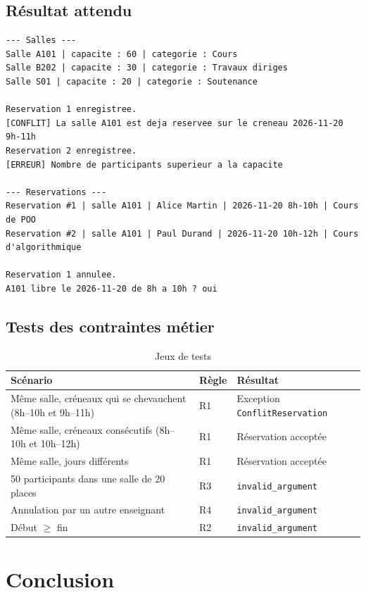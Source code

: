 \documentclass[12pt,a4paper]{report}
\begin{document}
\section{Résultat attendu}
\begin{lstlisting}[style=plain]
--- Salles ---
Salle A101 | capacite : 60 | categorie : Cours
Salle B202 | capacite : 30 | categorie : Travaux diriges
Salle S01 | capacite : 20 | categorie : Soutenance

Reservation 1 enregistree.
[CONFLIT] La salle A101 est deja reservee sur le creneau 2026-11-20 9h-11h
Reservation 2 enregistree.
[ERREUR] Nombre de participants superieur a la capacite

--- Reservations ---
Reservation #1 | salle A101 | Alice Martin | 2026-11-20 8h-10h | Cours de POO
Reservation #2 | salle A101 | Paul Durand | 2026-11-20 10h-12h | Cours d'algorithmique

Reservation 1 annulee.
A101 libre le 2026-11-20 de 8h a 10h ? oui
\end{lstlisting}

\section{Tests des contraintes métier}

\begin{table}[H]
\centering
\renewcommand{\arraystretch}{1.3}
\begin{tabular}{@{}p{5.2cm} p{4cm} p{4.4cm}@{}}
\toprule
\rowcolor{headcol}\textbf{Scénario} & \textbf{Règle} & \textbf{Résultat} \\
\midrule
Même salle, créneaux qui se chevauchent (8h--10h et 9h--11h) & R1 & Exception \texttt{ConflitReservation} \\
Même salle, créneaux consécutifs (8h--10h et 10h--12h) & R1 & Réservation acceptée \\
Même salle, jours différents & R1 & Réservation acceptée \\
50 participants dans une salle de 20 places & R3 & \texttt{invalid\_argument} \\
Annulation par un autre enseignant & R4 & \texttt{invalid\_argument} \\
Début $\geq$ fin & R2 & \texttt{invalid\_argument} \\
\bottomrule
\end{tabular}
\caption{Jeux de tests}
\end{table}

\chapter*{Conclusion}
\end{document}
